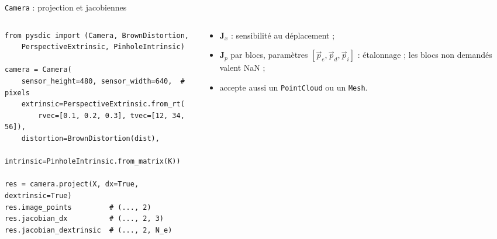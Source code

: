 \documentclass[aspectratio=169,11pt]{beamer}
\newcommand{\cls}[1]{\textcolor{pyblue}{\texttt{#1}}}
\begin{document}
\begin{frame}[fragile]{\texttt{Camera} : projection et jacobiennes}
  \centering
 
  \begin{columns}[T]
    \begin{column}{0.56\textwidth}
\begin{lstlisting}
from pysdic import (Camera, BrownDistortion,
    PerspectiveExtrinsic, PinholeIntrinsic)
 
camera = Camera(
    sensor_height=480, sensor_width=640,  # pixels
    extrinsic=PerspectiveExtrinsic.from_rt(
        rvec=[0.1, 0.2, 0.3], tvec=[12, 34, 56]),
    distortion=BrownDistortion(dist),
    intrinsic=PinholeIntrinsic.from_matrix(K))
 
res = camera.project(X, dx=True, dextrinsic=True)
res.image_points         # (..., 2)
res.jacobian_dx          # (..., 2, 3)
res.jacobian_dextrinsic  # (..., 2, N_e)
\end{lstlisting}
    \end{column}
    \begin{column}{0.42\textwidth}\small
      \begin{itemize}
        \item $\mathbf{J}_x$ : sensibilité au \alert{déplacement} ;
        \item $\mathbf{J}_p$ par blocs, paramètres $[\vec{p}_e, \vec{p}_d, \vec{p}_i]$ :
              \alert{étalonnage} ; les blocs non demandés valent NaN ;
        \item accepte aussi un \cls{PointCloud} ou un \cls{Mesh}.
      \end{itemize}
    \end{column}
  \end{columns}
\end{frame}
 
\end{document}
